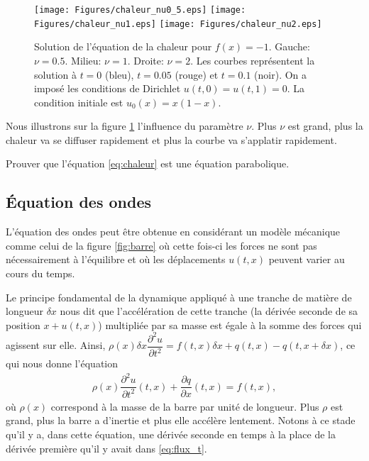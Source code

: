 \documentclass[12pt,a4paper,twoside]{article}
\begin{document}
\begin{figure}[h]
  \centering
  \texttt{[image: Figures/chaleur\_nu0\_5.eps]}
  \texttt{[image: Figures/chaleur\_nu1.eps]}
  \texttt{[image: Figures/chaleur\_nu2.eps]}
  \caption{Solution de l'\'equation de la chaleur
  pour $f(x) = -1$. Gauche: $\nu = 0.5$.
  Milieu: $\nu = 1$. Droite: $\nu = 2$.
  Les courbes repr\'esentent la solution \`a $t=0$ (bleu), $t=0.05$ (rouge) et $t=0.1$ (noir).
  On a impos\'e les conditions de Dirichlet $u(t,0) = u(t,1) = 0$.
  La condition initiale est $u_0(x) = x(1-x)$.}
  \label{fig:chaleur_nu}
\end{figure}


Nous illustrons sur la figure \ref{fig:chaleur_nu} l'influence du param\`etre $\nu$.
Plus $\nu$ est grand, plus la chaleur va se diffuser rapidement et plus 
la courbe va s'applatir rapidement.

\begin{exercise}
  Prouver que l'\'equation \eqref{eq:chaleur} est une \'equation parabolique.
\end{exercise}


\subsection{\'Equation des ondes}

L'\'equation des ondes peut \^etre obtenue en consid\'erant un mod\`ele m\'ecanique
comme celui de la figure \ref{fig:barre} o\`u cette fois-ci les forces ne
sont pas n\'ecessairement \`a l'\'equilibre et o\`u les d\'eplacements
$u(t,x)$ peuvent varier au cours du temps.

Le principe fondamental de la dynamique appliqu\'e \`a une tranche de mati\`ere
de longueur $\delta x$ nous dit que l'acc\'el\'eration de cette tranche (la d\'eriv\'ee seconde de sa position
$x+u(t,x)$) multipli\'ee par sa masse est \'egale \`a la somme des forces qui
agissent sur elle.
Ainsi, $\rho(x) \delta x \dfrac{\partial^2 u}{\partial t^2} = 
f(t,x) \delta x + q(t,x) - q(t, x + \delta x)$, ce qui nous donne l'\'equation
\begin{align}
  \label{eq:barre_t}
  \rho(x) \dfrac{\partial^2 u}{\partial t^2}(t,x) + \dfrac{\partial q}{\partial x}(t,x) = f(t,x) ,
\end{align}
o\`u $\rho(x)$ correspond \`a la masse de la barre par unit\'e de longueur.
Plus $\rho$ est grand, plus la barre a d'inertie et plus elle acc\'el\`ere lentement.
Notons \`a ce stade qu'il y a, dans cette \'equation, une d\'eriv\'ee seconde en temps
\`a la place de la d\'eriv\'ee premi\`ere qu'il y avait dans \eqref{eq:flux_t}.
\end{document}

